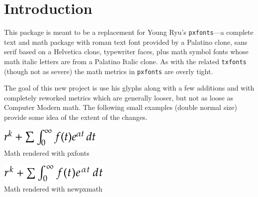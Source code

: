 \documentclass[11pt]{article}
\author{Michael Sharpe}
\date{\today}  %
\theoremstyle{oldplain}
\theoremstyle{plain}
\begin{document}
\maketitle
\section{Introduction}
This package is meant to be  a replacement for Young Ryu's {\tt pxfonts}---a complete text and math package with roman text font provided by a Palatino clone, sans serif based on a \textsf{Helvetica} clone, typewriter faces, plus math symbol fonts whose math italic letters are from a Palatino Italic clone. As with the related {\tt txfonts} (though not as severe) the math metrics in {\tt pxfonts} are overly tight.

The goal of this new project is use his glyphs along with a few additions and with completely reworked metrics which are generally looser, but not as loose as Computer Modern math. The following small examples (double normal size) provide some idea of the  extent of the changes.


\begin{minipage}{3.1in}
\begin{center}
\includegraphics[scale=2]{pxfontseg-crop}\\
Math rendered with pxfonts
\end{center}
\end{minipage}
\begin{minipage}{3.1in}
\begin{center}
\includegraphics[scale=2]{newpxeg-crop}\\
Math rendered with newpxmath
\end{center}

\end{minipage}
\end{document}
